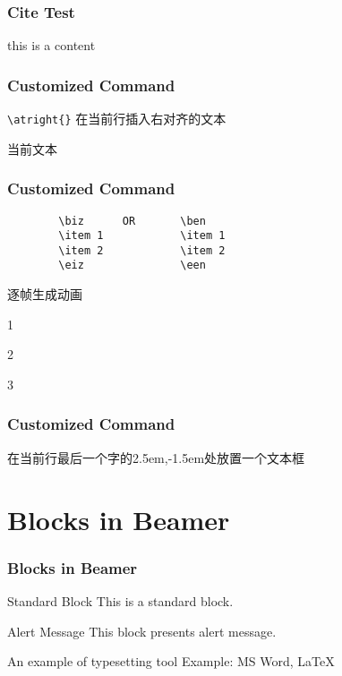 
\begin{frame}
	\frametitle{Cite Test}
	this is a content\footnotemark[\themynote]
	
\end{frame}

\begin{frame}[fragile]
    \frametitle{Customized Command}
    \verb*|\atright{}|
    在当前行插入右对齐的文本

    当前文本 
\end{frame}

\begin{frame}[fragile]
    \frametitle{Customized Command}
    \begin{verbatim}
        \biz      OR       \ben
        \item 1            \item 1
        \item 2            \item 2
        \eiz               \een
    \end{verbatim}
    逐帧生成动画
    
    \biz
    \item 1
    \item 2
    \item 3
    \eiz
\end{frame}

\begin{frame}
    \frametitle{Customized Command}
    在当前行最后一个字的{2.5em,-1.5em}处放置一个文本框
\end{frame}

\section{Blocks in Beamer}
\begin{frame}
    \frametitle{Blocks in Beamer}
    \begin{block}{Standard Block}
		This is a standard block.
	\end{block}
	\begin{alertblock}{Alert Message}
		This block presents alert message.
	\end{alertblock}
	\begin{exampleblock}{An example of typesetting tool}
		Example: MS Word, \LaTeX{}
	\end{exampleblock}
\end{frame}

